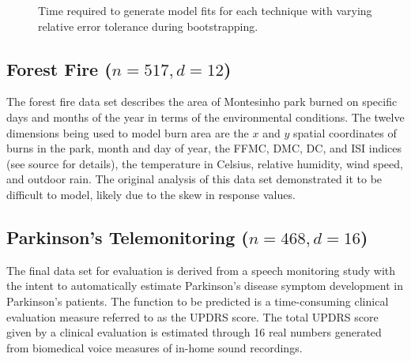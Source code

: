 \begin{figure}[htb]
  \centering
  \caption{Time required to generate model fits for each technique with varying relative error tolerance during bootstrapping.
    \vspace{-.3cm}}
  \label{fig_eval_times}
\end{figure}

\subsection{Forest Fire ($n = 517, d = 12$)}
The forest fire data set \cite{cortez2007data} describes the area of Montesinho park burned on specific days and months of the year in terms of the environmental conditions. The twelve dimensions being used to model burn area are the $x$ and $y$ spatial coordinates of burns in the park, month and day of year, the FFMC, DMC, DC, and ISI indices (see source for details), the temperature in Celsius, relative humidity, wind speed, and outdoor rain. The original analysis of this data set demonstrated it to be difficult to model, likely due to the skew in response values.

\subsection{Parkinson's Telemonitoring ($n = 468, d = 16$)}
The final data set for evaluation \cite{tsanas2010accurate} is derived from a speech monitoring study with the intent to automatically estimate Parkinson's disease symptom development in Parkinson's patients. The function to be predicted is a time-consuming clinical evaluation measure referred to as the UPDRS score. The total UPDRS score given by a clinical evaluation is estimated through 16 real numbers generated from biomedical voice measures of in-home sound recordings.

